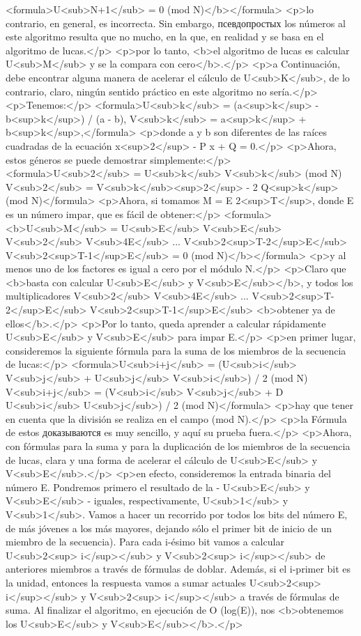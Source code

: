 <formula>U<sub>N+1</sub> = 0 (mod N)</b></formula>
<p>lo contrario, en general, es incorrecta. Sin embargo, псевдопростых los números al este algoritmo resulta que no mucho, en la que, en realidad y se basa en el algoritmo de lucas.</p>
<p>por lo tanto, <b>el algoritmo de lucas es calcular U<sub>M</sub> y se la compara con cero</b>.</p>
<p>a Continuación, debe encontrar alguna manera de acelerar el cálculo de U<sub>K</sub>, de lo contrario, claro, ningún sentido práctico en este algoritmo no sería.</p>
<p>Tenemos:</p>
<formula>U<sub>k</sub> = (a<sup>k</sup> - b<sup>k</sup>) / (a - b),
V<sub>k</sub> = a<sup>k</sup> + b<sup>k</sup>,</formula>
<p>donde a y b son diferentes de las raíces cuadradas de la ecuación x<sup>2</sup> - P x + Q = 0.</p>
<p>Ahora, estos géneros se puede demostrar simplemente:</p>
<formula>U<sub>2</sub> = U<sub>k</sub> V<sub>k</sub> (mod N)
V<sub>2</sub> = V<sub>k</sub><sup>2</sup> - 2 Q<sup>k</sup> (mod N)</formula>
<p>Ahora, si tomamos M = E 2<sup>T</sup>, donde E es un número impar, que es fácil de obtener:</p>
<formula><b>U<sub>M</sub> = U<sub>E</sub> V<sub>E</sub> V<sub>2</sub> V<sub>4E</sub> ... V<sub>2<sup>T-2</sup>E</sub> V<sub>2<sup>T-1</sup>E</sub> = 0 (mod N)</b></formula>
<p>y al menos uno de los factores es igual a cero por el módulo N.</p>
<p>Claro que <b>basta con calcular U<sub>E</sub> y V<sub>E</sub></b>, y todos los multiplicadores V<sub>2</sub> V<sub>4E</sub> ... V<sub>2<sup>T-2</sup>E</sub> V<sub>2<sup>T-1</sup>E</sub> <b>obtener ya de ellos</b>.</p>
<p>Por lo tanto, queda aprender a calcular rápidamente U<sub>E</sub> y V<sub>E</sub> para impar E.</p>
<p>en primer lugar, consideremos la siguiente fórmula para la suma de los miembros de la secuencia de lucas:</p>
<formula>U<sub>i+j</sub> = (U<sub>i</sub> V<sub>j</sub> + U<sub>j</sub> V<sub>i</sub>) / 2 (mod N)
V<sub>i+j</sub> = (V<sub>i</sub> V<sub>j</sub> + D U<sub>i</sub> U<sub>j</sub>) / 2 (mod N)</formula>
<p>hay que tener en cuenta que la división se realiza en el campo (mod N).</p>
<p>la Fórmula de estos доказываются es muy sencillo, y aquí su prueba fuera.</p>
<p>Ahora, con fórmulas para la suma y para la duplicación de los miembros de la secuencia de lucas, clara y una forma de acelerar el cálculo de U<sub>E</sub> y V<sub>E</sub>.</p>
<p>en efecto, consideremos la entrada binaria del número E. Pondremos primero el resultado de la - U<sub>E</sub> y V<sub>E</sub> - iguales, respectivamente, U<sub>1</sub> y V<sub>1</sub>. Vamos a hacer un recorrido por todos los bits del número E, de más jóvenes a los más mayores, dejando sólo el primer bit de inicio de un miembro de la secuencia). Para cada i-ésimo bit vamos a calcular U<sub>2<sup> i</sup></sub> y V<sub>2<sup> i</sup></sub> de anteriores miembros a través de fórmulas de doblar. Además, si el i-primer bit es la unidad, entonces la respuesta vamos a sumar actuales U<sub>2<sup> i</sup></sub> y V<sub>2<sup> i</sup></sub> a través de fórmulas de suma. Al finalizar el algoritmo, en ejecución de O (log(E)), nos <b>obtenemos los U<sub>E</sub> y V<sub>E</sub></b>.</p>
